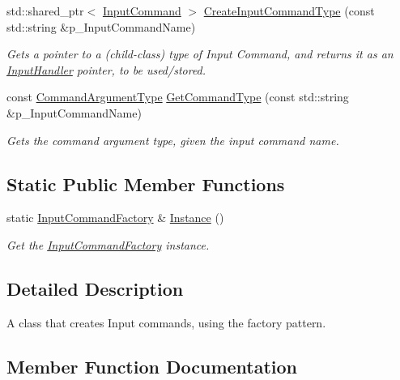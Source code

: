 \begin{DoxyCompactItemize}
std\+::shared\+\_\+ptr$<$ \mbox{\hyperlink{class_input_command}{Input\+Command}} $>$ \mbox{\hyperlink{class_input_command_factory_aa8d970f687c0392459ec1e596534c679}{Create\+Input\+Command\+Type}} (const std\+::string \&p\+\_\+\+Input\+Command\+Name)
\begin{DoxyCompactList}\small\item\em Gets a pointer to a (child-\/class) type of Input Command, and returns it as an \mbox{\hyperlink{class_input_handler}{Input\+Handler}} pointer, to be used/stored. \end{DoxyCompactList}\item 
const \mbox{\hyperlink{_command_argument_types_8h_adefdc85c4f4f8765e96fd2f0d78b133e}{Command\+Argument\+Type}} \mbox{\hyperlink{class_input_command_factory_a5f747618cbe98cce652dbf98cd9fa32c}{Get\+Command\+Type}} (const std\+::string \&p\+\_\+\+Input\+Command\+Name)
\begin{DoxyCompactList}\small\item\em Gets the command argument type, given the input command name. \end{DoxyCompactList}\end{DoxyCompactItemize}
\subsection*{Static Public Member Functions}
\begin{DoxyCompactItemize}
\item 
static \mbox{\hyperlink{class_input_command_factory}{Input\+Command\+Factory}} \& \mbox{\hyperlink{class_input_command_factory_ae05897e1e26aedb25705479016f69735}{Instance}} ()
\begin{DoxyCompactList}\small\item\em Get the \mbox{\hyperlink{class_input_command_factory}{Input\+Command\+Factory}} instance. \end{DoxyCompactList}\end{DoxyCompactItemize}


\subsection{Detailed Description}
A class that creates Input commands, using the factory pattern. 

\subsection{Member Function Documentation}
\mbox{\label{class_input_command_factory_a4ea90122e946a301e8b645a656170ea4}} 

